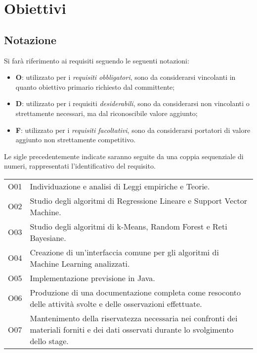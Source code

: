 \section{Obiettivi}
\subsection{Notazione}
Si farà riferimento ai requisiti seguendo le seguenti notazioni:
\begin{itemize}
\item \textbf{O}: utilizzato per i \textit{requisiti obbligatori}, sono da considerarsi vincolanti in quanto obiettivo primario richiesto dal committente;
\item \textbf{D}: utilizzato per i requisiti \textit{desiderabili}, sono da considerarsi non vincolanti o strettamente necessari, ma dal riconoscibile valore
aggiunto;
\item \textbf{F}: utilizzato per i \textit{requisiti facoltativi}, sono da considerarsi portatori di valore aggiunto non strettamente competitivo.
\end{itemize}
Le sigle precedentemente indicate saranno seguite da una coppia sequenziale di numeri, rappresentati l'identificativo del requisito.

{\renewcommand{\arraystretch}{2}
\begin{longtable}{|p{1cm}| p{12.25cm} |}
	\hline
	\rowcolor{blue} \multicolumn{2}{|c|}{
	\textbf{Obbligatori}
	} \\
		\endhead
		\hline \rowcolor{lightbrown}
		O01 & 
		Individuazione e analisi di Leggi empiriche  e Teorie. \\	
		\hline \rowcolor{lighterbrown}
		O02 & 
		Studio degli algoritmi di Regressione Lineare e Support Vector Machine. \\	
		\hline \rowcolor{lightbrown}
		O03 & 
		Studio degli algoritmi di k-Means, Random Forest e Reti Bayesiane.\\	
	\hline \rowcolor{lighterbrown}
		O04 & 
		Creazione di un'interfaccia comune per gli algoritmi di Machine Learning analizzati.\\	
	\hline \rowcolor{lightbrown}
		O05 & 
		Implementazione previsione in Java.\\	
	\hline \rowcolor{lighterbrown}
		O06 & 
		Produzione di una documentazione completa come resoconto delle attività svolte e delle
osservazioni effettuate.\\	
	\hline \rowcolor{lightbrown}
		O07 & 
		Mantenimento della riservatezza necessaria nei confronti dei materiali forniti e dei dati osservati durante lo svolgimento dello stage.\\	
	\hline
\end{longtable}}

